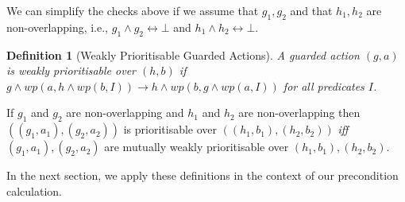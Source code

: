 \documentclass[11pt]{article}
\newtheorem{definition}{Definition}
\begin{document}
We can simplify the checks above if we assume that $g_1, g_2$ and that $h_1, h_2$ are non-overlapping, i.e., $g_1 \land g_2 \longleftrightarrow \bot$ and $h_1 \land h_2 \longleftrightarrow \bot$.

\begin{definition}[Weakly Prioritisable Guarded Actions]
A guarded action $(g,a)$ is weakly prioritisable over $(h,b)$ if
$g \land wp(a,h \land wp(b,I)) \longrightarrow h \land wp(b,g \land wp(a,I))$ for all predicates $I$.
\end{definition}

If $g_1$ and $g_2$ are non-overlapping and $h_1$ and $h_2$ are non-overlapping then $((g_1,a_1),(g_2,a_2))$ is prioritisable over $((h_1,b_1),(h_2,b_2))$ \textit{iff} $(g_1,a_1),(g_2,a_2)$ are mutually weakly prioritisable over $(h_1,b_1),(h_2,b_2)$. 
              
In the next section, we apply these definitions in the context of our precondition calculation. 


%

%
%
\end{document}
